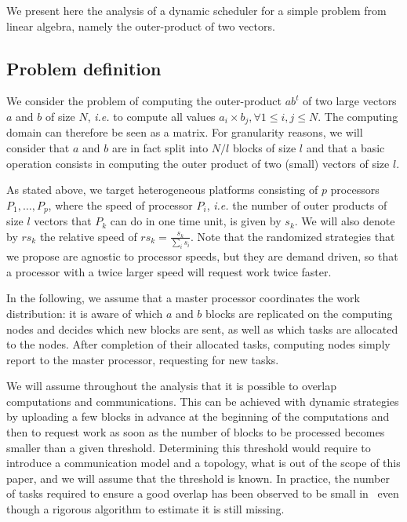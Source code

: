 \documentclass[a4paper,10pt]{article}
\newcommand{\ie}{{\it i.e.}\xspace}
\begin{document}
We present here the analysis of a dynamic scheduler for a simple
problem from linear algebra, namely the outer-product of two vectors.

\subsection{Problem definition}

We consider the problem of computing the outer-product $a b^t$ of two
large vectors $a$ and $b$ of size $N$, \ie to compute all values $a_i
\times b_j, \forall 1 \leq i,j \leq N$. The computing domain can
therefore be seen as a matrix. For granularity reasons, we will
consider that $a$ and $b$ are in fact split into $N/l$ blocks of size
$l$ and that a basic operation consists in computing the outer product
of two (small) vectors of size $l$.

As stated above, we target heterogeneous platforms consisting of $p$
processors $P_1,\ldots,P_p$, where the speed of processor $P_i$, \ie
the number of outer products of size $l$ vectors that $P_k$ can do in
one time unit, is given by $s_k$. We will also denote by
$\mathit{rs}_k$ the relative speed of $\mathit{rs}_k =
\frac{s_k}{\sum_i s_i}$. Note that the randomized strategies that we
propose are agnostic to processor speeds, but they are demand driven,
so that a processor with a twice larger speed will request work twice
faster.

In the following, we assume that a master processor coordinates the
work distribution: it is aware of which $a$ and $b$ blocks are
replicated on the computing nodes and decides which new blocks are
sent, as well as which tasks are allocated to the
nodes. After completion of their allocated tasks, computing nodes
simply report to the master processor, requesting for new tasks.


We will assume throughout the analysis that it is possible to overlap
computations and communications. This can be achieved with dynamic
strategies by uploading a few blocks in advance at the beginning of
the computations and then to request work as soon as the number of
blocks to be processed becomes smaller than a given
threshold. Determining this threshold would require to introduce a
communication model and a topology, what is out of the scope of this
paper, and we will assume that the threshold is known. In practice,
the number of tasks required to ensure a good overlap has been observed to be small
in~\cite{kreaseck2003autonomous,parashar2006autonomic} even though a
rigorous algorithm to estimate it is still missing.
\end{document}
